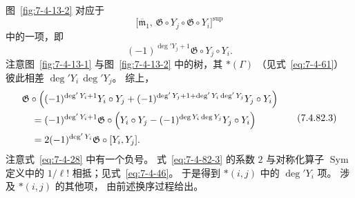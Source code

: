 图~\ref{fig:7-4-13-2}
对应于
\[
\bigl[
\overline{\mathfrak m}_1,\,
\mathfrak G\circ Y_j\circ
\mathfrak G\circ Y_i
\bigr]^{\mathrm{sup}}
\]
中的一项，即
\begin{equation}
(-1)^{\deg'Y_j+1}
\mathfrak G\circ Y_j\circ Y_i.
\tag{7.4.82.2}\label{eq:7-4-82-2}
\end{equation}
注意图~\ref{fig:7-4-13-1}
与图~\ref{fig:7-4-13-2}
中的树，其
$*(\Gamma)$
（见式~\eqref{eq:7-4-61}）
彼此相差
$\deg'Y_i\,\deg'Y_j$。
综上，
\begin{equation}
\begin{aligned}
&\mathfrak G\circ
\Bigl(
(-1)^{\deg'Y_i+1}
Y_i\circ Y_j
+(-1)^{
\deg'Y_j+1+\deg'Y_i\deg'Y_j
}
Y_j\circ Y_i
\Bigr)\\
&\quad=
(-1)^{\deg'Y_i+1}
\mathfrak G\circ
\Bigl(
Y_i\circ Y_j
-(-1)^{\deg Y_i\deg Y_j}
Y_j\circ Y_i
\Bigr)\\
&\quad=
2(-1)^{\deg'Y_i}
\mathfrak G\circ[Y_i,Y_j].
\end{aligned}
\tag{7.4.82.3}\label{eq:7-4-82-3}
\end{equation}
注意式~\eqref{eq:7-4-28}
中有一个负号。
式~\eqref{eq:7-4-82-3}
的系数 $2$
与对称化算子
$\operatorname{Sym}$
定义中的 $1/\ell!$
相抵；见式~\eqref{eq:7-4-46}。
于是得到
$*(i,j)$ 中的
$\deg'Y_i$ 项。
涉及 $*(i,j)$
的其他项，
由前述换序过程给出。
